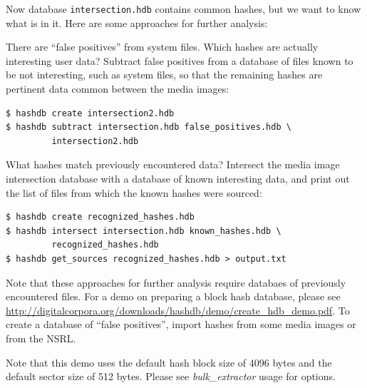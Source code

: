 \documentclass[12pt,twoside]{article}
\newcommand{\bulk}{\emph{bulk\_extractor}\xspace}
\begin{document}
Now database \texttt{intersection.hdb} contains common hashes,
but we want to know what is in it.
Here are some approaches for further analysis:
\begin{compactitem}
\item There are ``false positives'' from system files.
Which hashes are actually interesting user data?
Subtract false positives from a database of files known to be not interesting,
such as system files,
so that the remaining hashes are pertinent data common between the
media images:
\begin{verbatim}
$ hashdb create intersection2.hdb
$ hashdb subtract intersection.hdb false_positives.hdb \
         intersection2.hdb
\end{verbatim}

\item What hashes match previously encountered data?
Intersect the media image intersection database
with a database of known interesting data,
and print out the list of files from which the known hashes were sourced:
\begin{verbatim}
$ hashdb create recognized_hashes.hdb
$ hashdb intersect intersection.hdb known_hashes.hdb \
         recognized_hashes.hdb
$ hashdb get_sources recognized_hashes.hdb > output.txt
\end{verbatim}
\end{compactitem}

Note that these approaches for further analysis require
databaes of previously encountered files.
For a demo on preparing a block hash database, please see
\url{http://digitalcorpora.org/downloads/hashdb/demo/create\_hdb\_demo.pdf}.
To create a database of ``false positives'',
import hashes from some media images or from the NSRL.

Note that this demo uses the default hash block size of 4096 bytes
and the default sector size of 512 bytes.
Please see \bulk usage for options.
\end{document}
